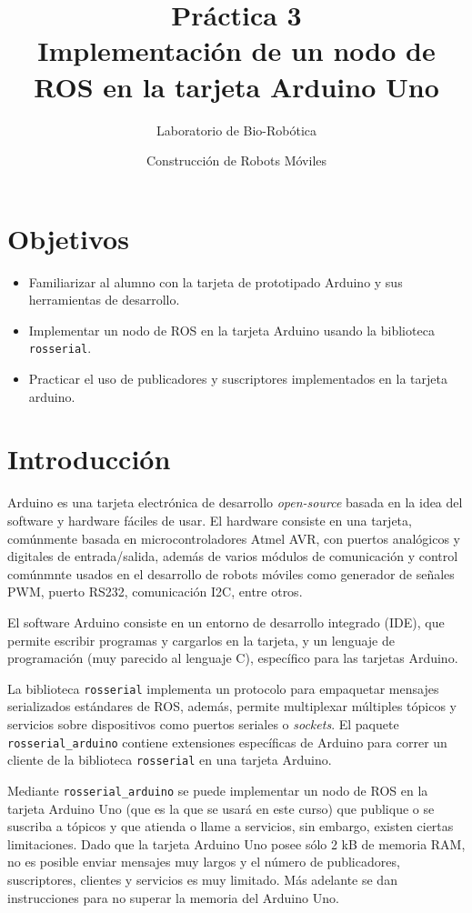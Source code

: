 \documentclass[a4paper,12pt]{article}
\title{Práctica 3 \\ Implementación de un nodo de ROS en la tarjeta Arduino Uno}
\author{Laboratorio de Bio-Robótica}
\date{Construcción de Robots Móviles}
\begin{document}
\renewcommand{\tablename}{Tabla}
\maketitle
\section*{Objetivos}
\begin{itemize}
\item Familiarizar al alumno con la tarjeta de prototipado Arduino y sus herramientas de desarrollo.
\item Implementar un nodo de ROS en la tarjeta Arduino usando la biblioteca \texttt{rosserial}.
\item Practicar el uso de publicadores y suscriptores implementados en la tarjeta arduino. 
\end{itemize}

\section{Introducción}

Arduino es una tarjeta electrónica de desarrollo \textit{open-source} basada en la idea del software y hardware fáciles de usar. El hardware consiste en una tarjeta, comúnmente basada en microcontroladores Atmel AVR, con puertos analógicos y digitales de entrada/salida, además de varios módulos de comunicación y control comúnmnte usados en el desarrollo de robots móviles como generador de señales PWM, puerto RS232, comunicación I2C, entre otros. 

El software Arduino consiste en un entorno de desarrollo integrado (IDE), que permite escribir programas y cargarlos en la tarjeta, y un lenguaje de programación (muy parecido al lenguaje C), específico para las tarjetas Arduino. 

La biblioteca \texttt{rosserial} implementa un protocolo para empaquetar mensajes serializados estándares de ROS, además, permite multiplexar múltiples tópicos y servicios sobre dispositivos como puertos seriales o \textit{sockets}. El paquete \texttt{rosserial\_arduino} contiene extensiones específicas de Arduino para correr un cliente de la biblioteca \texttt{rosserial} en una tarjeta Arduino.

Mediante \texttt{rosserial\_arduino} se puede implementar un nodo de ROS en la tarjeta Arduino Uno (que es la que se usará en este curso) que publique o se suscriba a tópicos y que atienda o llame a servicios, sin embargo, existen ciertas limitaciones. Dado que la tarjeta Arduino Uno posee sólo 2 kB de memoria RAM, no es posible enviar mensajes muy largos y el número de publicadores, suscriptores, clientes y servicios es muy limitado. Más adelante se dan instrucciones para no superar la memoria del Arduino Uno. 
\end{document}
